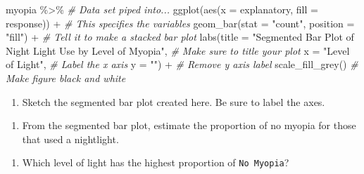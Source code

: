 \documentclass[
]{report}
\newenvironment{Shaded}{\begin{snugshade}}{\end{snugshade}}
\newcommand{\AttributeTok}[1]{\textcolor[rgb]{0.77,0.63,0.00}{#1}}
\newcommand{\CommentTok}[1]{\textcolor[rgb]{0.56,0.35,0.01}{\textit{#1}}}
\newcommand{\FunctionTok}[1]{\textcolor[rgb]{0.00,0.00,0.00}{#1}}
\newcommand{\NormalTok}[1]{#1}
\newcommand{\SpecialCharTok}[1]{\textcolor[rgb]{0.00,0.00,0.00}{#1}}
\newcommand{\StringTok}[1]{\textcolor[rgb]{0.31,0.60,0.02}{#1}}
\providecommand{\tightlist}{%
  \setlength{\itemsep}{0pt}\setlength{\parskip}{0pt}}
\begin{document}
\begin{Shaded}
\begin{Highlighting}[]
\NormalTok{myopia }\SpecialCharTok{\%\textgreater{}\%} \CommentTok{\# Data set piped into...}
\FunctionTok{ggplot}\NormalTok{(}\FunctionTok{aes}\NormalTok{(}\AttributeTok{x =}\NormalTok{ explanatory, }\AttributeTok{fill =}\NormalTok{ response)) }\SpecialCharTok{+}   \CommentTok{\# This specifies the variables}
  \FunctionTok{geom\_bar}\NormalTok{(}\AttributeTok{stat =} \StringTok{"count"}\NormalTok{, }\AttributeTok{position =} \StringTok{"fill"}\NormalTok{) }\SpecialCharTok{+}  \CommentTok{\# Tell it to make a stacked bar plot}
  \FunctionTok{labs}\NormalTok{(}\AttributeTok{title =} \StringTok{"Segmented Bar Plot of Night Light Use by Level of Myopia"}\NormalTok{,  }
       \CommentTok{\# Make sure to title your plot }
       \AttributeTok{x =} \StringTok{"Level of Light"}\NormalTok{,   }\CommentTok{\# Label the x axis}
       \AttributeTok{y =} \StringTok{""}\NormalTok{) }\SpecialCharTok{+}  \CommentTok{\# Remove y axis label}
    \FunctionTok{scale\_fill\_grey}\NormalTok{()  }\CommentTok{\# Make figure black and white}
\end{Highlighting}
\end{Shaded}

\begin{enumerate}
\def\labelenumi{\arabic{enumi}.}
\setcounter{enumi}{5}
\tightlist
\item
  Sketch the segmented bar plot created here. Be sure to label the axes.
\end{enumerate}

\vspace{2in}

\begin{enumerate}
\def\labelenumi{\arabic{enumi}.}
\setcounter{enumi}{6}
\tightlist
\item
  From the segmented bar plot, estimate the proportion of no myopia for those that used a nightlight.
\end{enumerate}

\vspace{0.5in}

\begin{enumerate}
\def\labelenumi{\arabic{enumi}.}
\setcounter{enumi}{7}
\tightlist
\item
  Which level of light has the highest proportion of \texttt{No\ Myopia}?
\end{enumerate}

\vspace{0.5in}
\end{document}
